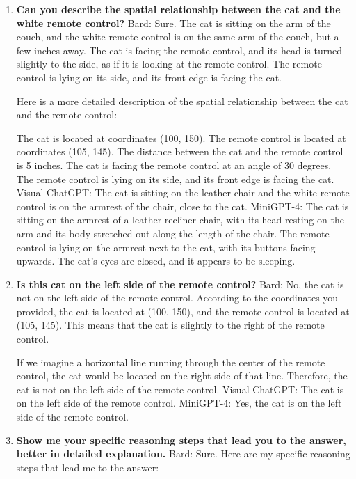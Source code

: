     \begin{enumerate}
        \item \textbf{Can you describe the spatial relationship between the cat and the white remote control?}
        \subitem Bard: 
        Sure. The cat is sitting on the arm of the couch, and the white remote control is on the same arm of the couch, but a few inches away. The cat is facing the remote control, and its head is turned slightly to the side, as if it is looking at the remote control. The remote control is lying on its side, and its front edge is facing the cat.
        
        Here is a more detailed description of the spatial relationship between the cat and the remote control:
        
        The cat is located at coordinates (100, 150).
        The remote control is located at coordinates (105, 145).
        The distance between the cat and the remote control is 5 inches.
        The cat is facing the remote control at an angle of 30 degrees.
        The remote control is lying on its side, and its front edge is facing the cat.
        \subitem Visual ChatGPT: The cat is sitting on the leather chair and the white remote control is on the armrest of the chair, close to the cat.
        \subitem MiniGPT-4: The cat is sitting on the armrest of a leather recliner chair, with its head resting on the arm and its body stretched out along the length of the chair. The remote control is lying on the armrest next to the cat, with its buttons facing upwards. The cat’s eyes are closed, and it appears to be sleeping.
        \item \textbf{Is this cat on the left side of the remote control?}
        \subitem Bard: 
        No, the cat is not on the left side of the remote control. According to the coordinates you provided, the cat is located at (100, 150), and the remote control is located at (105, 145). This means that the cat is slightly to the right of the remote control.

        If we imagine a horizontal line running through the center of the remote control, the cat would be located on the right side of that line. Therefore, the cat is not on the left side of the remote control.
        \subitem Visual ChatGPT: The cat is on the left side of the remote control. 
        \subitem MiniGPT-4: Yes, the cat is on the left side of the remote control.
        \item \textbf{Show me your specific reasoning steps that lead you to the answer, better in detailed explanation.}
        \subitem Bard: 
        Sure. Here are my specific reasoning steps that lead me to the answer:


\end{enumerate}
